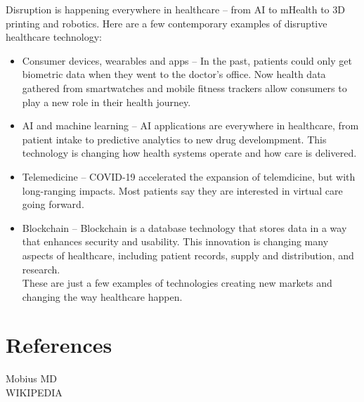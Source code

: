 \documentclass[12pt]{article}
\begin{document}
\large Disruption is happening everywhere in healthcare – from AI to mHealth to 3D printing and robotics. Here are a few contemporary examples of disruptive healthcare technology:\\
\begin{itemize}


\item Consumer devices, wearables and apps – In the past, patients could only get biometric data when they went to the doctor’s office. Now health data gathered from smartwatches and mobile fitness trackers allow consumers to play a new role in their health journey.\\
\item AI and machine learning – AI applications are everywhere in healthcare, from patient intake to predictive analytics to new drug develompment. This technology is changing how health systems operate and how care is delivered.\\
\item Telemedicine – COVID-19 accelerated the expansion of telemdicine, but with long-ranging impacts. Most patients say they are interested in virtual care going forward.\\
\item Blockchain – Blockchain is a database technology that stores data in a way that enhances security and usability. This innovation is changing many aspects of healthcare, including patient records, supply and distribution, and research.\\
These are just a few examples of technologies creating new markets and changing the way healthcare happen.
\end{itemize}

\pagebreak

\flushleft\section{\Large\centering\textbf{References}}

Mobius MD\\

WIKIPEDIA
\end{document}
